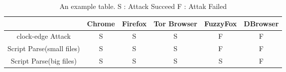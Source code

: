 \documentclass{article}
\begin{document}
\begin{table}[!h]
	\centering
	\begin{tabular}{*6c}
	\toprule
	{} & Chrome & Firefox & Tor Browser & FuzzyFox & DBrowser \\
	\midrule
	clock-edge Attack & S & S & S & F & F \\
	Script Parse(small files) & S & S & S & F & F \\
	Script Parse(big files) & S & S & S & S & F \\
	\bottomrule
	\end{tabular}
	\caption{\label{tab:widgets}An example table. S : Attack Succeed F : Attak Failed }
\end{table}
\end{document}

